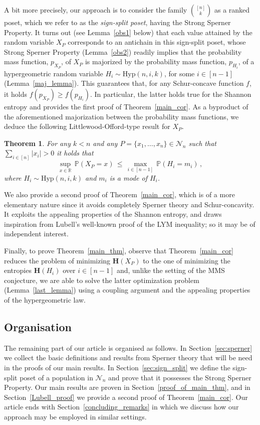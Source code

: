 \documentclass[11pt]{article}
\newtheorem{theorem}{Theorem}
\newcommand{\Prb}{\mathbb{P}}
\newcommand{\bh}{\mathbf{H}}
\begin{document}
A bit more precisely, our  approach is to consider the family  $\binom{[n]}{k}$ as a ranked   poset, which we refer to as the \emph{sign-split poset}, having the Strong Sperner Property. 
It turns out (see Lemma~\ref{obs1} below) that each value attained by the random variable $X_P$ corresponds to an antichain in this sign-split poset, whose Strong Sperner  Property (Lemma~\ref{obs2})  readily implies    that the probability mass function, $p_{X_P}$, of $X_P$ is majorized by the probability mass function, $p_{H_i}$, of a hypergeometric random variable $H_i\sim\text{Hyp}(n,i,k)$, for some $i\in [n-1]$ (Lemma~\ref{maj_lemma}). 
This guarantees that, for any Schur-concave function $f$, it holds 
$f(p_{X_P})\ge f(p_{H_i})$. In particular, the latter holds true for the  Shannon entropy and provides the first proof of Theorem~\ref{main_cor}.   
As a byproduct of the aforementioned   majorization between the   probability mass functions, we deduce  the  following Littlewood-Offord-type result for  $X_P$.  

\begin{theorem}\label{main_thm2}
For any $k<n$ and any $P=\{x_1,\ldots,x_n\}\in\mathcal{N}_n$ such that $\sum_{i\in [n]}|x_i|>0$ it holds that 
\[
\sup_{x\in \mathbb{R}}\,\Prb(X_P = x) \,\le\, \max_{i\in [n-1]} \,\Prb(H_i = m_i) \, ,
\]
where $H_i\sim\text{Hyp}(n,i,k)$ and $m_i$ is a mode of $H_i$. 
\end{theorem}

We also provide a second proof of Theorem~\ref{main_cor}, which is of a more elementary nature since it   avoids completely Sperner theory and Schur-concavity. It exploits the appealing  properties of the Shannon entropy, and draws inspiration from  Lubell's well-known proof of the LYM inequality; so it may be of independent interest. 


Finally, to prove Theorem~\ref{main_thm}, observe that  Theorem~\ref{main_cor}  reduces the problem of minimizing $\bh(X_P)$ to the one of minimizing the entropies $\bh(H_i)$ over $i\in [n-1]$ and, unlike the setting of the MMS conjecture, we are able to solve the latter optimization problem  (Lemma~\ref{last_lemma}) 
using a coupling argument and the appealing properties of the hypergeometric law. 

\subsection{Organisation} 

The remaining part of our article is organised as follows. 
In Section~\ref{sec:sperner} we collect the basic definitions and results from Sperner theory that will be need in the proofs of our main results. 
In Section~\ref{sec:sign_split} we define the sign-split poset of a population in $\mathcal{N}_n$ and prove that it possesses the Strong Sperner Property.  Our main results are proven in   
Section~\ref{proof_of_main_thm}, and in Section~\ref{Lubell_proof} we provide a second proof of Theorem~\ref{main_cor}.  
Our article ends with Section~\ref{concluding_remarks}  in which we discuss how our approach may be employed in similar  settings. 
\end{document}
